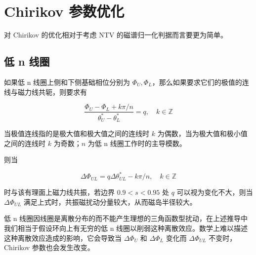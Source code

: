  
  
    


    
  
\section{Chirikov 参数优化}

对 Chirikov 的优化相对于考虑 NTV 的磁谱归一化判据而言要更为简单。

\subsection{低 n 线圈}
如果低 n 线圈上侧和下侧基础相位分别为 $\Phi_U, \Phi_L$，那么如果要求它们的极值的连线与磁力线共轭，则要求有 

\begin{equation}
  \frac{\Phi_U - \Phi_L + k\pi /n }{\theta^*_U - \theta^*_L} = q, \quad k\in \mathbb{Z}
\end{equation}

当极值连线指的是极大值和极大值之间的连线时 $k$ 为偶数，当为极大值和极小值之间的连线时 $k$ 为奇数；$n$ 为低 n 线圈工作时的主导模数。

则当 

\begin{equation}
  \Delta\Phi_{UL} = q \Delta\theta^*_{UL} -k \pi /n, \quad k\in\mathbb{Z}
\end{equation}

时与该有理面上磁力线共振，若边界 $0.9<s<0.95$ 处 $q$ 可以视为变化不大，则当 $\Delta\Phi_{UL}$ 满足上式时，共振磁扰动分量较大，从而磁岛半径较大。

低 n 线圈因线圈是离散分布的而不能产生理想的三角函数型扰动，在上述推导中我们相当于假设环向上有无穷的低 n 线圈以削弱这种离散效应。数学上难以描述这种离散效应造成的影响，它会导致当 $\Delta\Phi_{U} $ 和 $\Delta\Phi_{L} $ 变化而 $\Delta\Phi_{UL} $ 不变时，Chirikov 参数也会发生改变。



